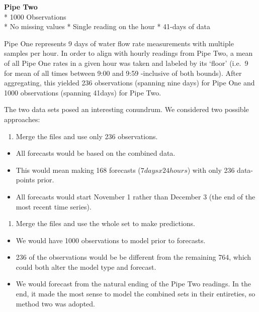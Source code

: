 \documentclass[openany]{book}
\providecommand{\tightlist}{%
  \setlength{\itemsep}{0pt}\setlength{\parskip}{0pt}}
\begin{document}
\textbf{Pipe Two}\\
* 1000 Observations\\
* No missing values * Single reading on the hour * 41-days of data

Pipe One represents 9 days of water flow rate measurements with multiple
samples per hour. In order to align with hourly readings from Pipe Two,
a mean of all Pipe One rates in a given hour was taken and labeled by
its `floor' (i.e.~9 for mean of all times between 9:00 and 9:59
-inclusive of both bounds). After aggregating, this yielded 236
observations (spanning nine days) for Pipe One and 1000 observations
(spanning 41days) for Pipe Two.

The two data sets posed an interesting conundrum. We considered two
possible approaches:

\begin{enumerate}
\def\labelenumi{\arabic{enumi}.}
\tightlist
\item
  Merge the files and use only 236 observations.
\end{enumerate}

\begin{itemize}
\tightlist
\item
  All forecasts would be based on the combined data.
\item
  This would mean making 168 forecasts (\(7days x 24hours\)) with only
  236 data-points prior.
\item
  All forecasts would start November 1 rather than December 3 (the end
  of the most recent time series).\\
\end{itemize}

\begin{enumerate}
\def\labelenumi{\arabic{enumi}.}
\setcounter{enumi}{1}
\tightlist
\item
  Merge the files and use the whole set to make predictions.\\
\end{enumerate}

\begin{itemize}
\tightlist
\item
  We would have 1000 observations to model prior to forecasts.
\item
  236 of the observations would be be different from the remaining 764,
  which could both alter the model type and forecast.
\item
  We would forecast from the natural ending of the Pipe Two readings. In
  the end, it made the most sense to model the combined sets in their
  entireties, so method two was adopted.
\end{itemize}
\end{document}
